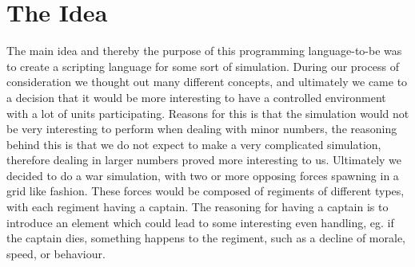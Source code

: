 \section{The Idea}
The main idea and thereby the purpose of this programming language-to-be was to create a scripting language for some sort of simulation. During our process of consideration we thought out many different concepts, and ultimately we came to a decision that it would be more interesting to have a controlled environment with a lot of units participating. Reasons for this is that the simulation would not be very interesting to perform when dealing with minor numbers, the reasoning behind this is that we do not expect to make a very complicated simulation, therefore dealing in larger numbers proved more interesting to us. \newline
Ultimately we decided to do a war simulation, with two or more opposing forces spawning in a grid like fashion. These forces would be composed of regiments of different types, with each regiment having a captain. The reasoning for having a captain is to introduce an element which could lead to some interesting even handling, eg. if the captain dies, something happens to the regiment, such as a decline of morale, speed, or behaviour.